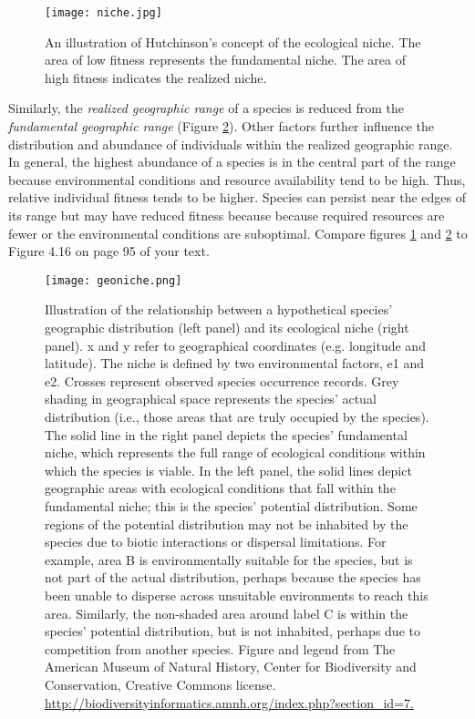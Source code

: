 \documentclass[12pt, oneside]{article}   	%
\begin{document}
\begin{figure}[htb]
	\centering
	\texttt{[image: niche.jpg]}
	\caption{An illustration of Hutchinson's concept of the ecological niche. The area of low fitness represents the fundamental niche. The area of high fitness indicates the realized niche. \label{hutch niche}}
\end{figure}

Similarly, the \emph{realized geographic range} of a species is reduced from the \emph{fundamental geographic range} (Figure \ref{geoniche}). Other factors further influence the distribution and abundance of individuals within the realized geographic range. In general, the highest abundance of a species is in the central part of the range because environmental conditions and resource availability tend to be high. Thus, relative individual fitness tends to be higher.  Species can persist near the edges of its range but may have reduced fitness because because required resources are fewer or the environmental conditions are suboptimal.  Compare figures \ref{hutch niche} and \ref{geoniche} to Figure 4.16 on page 95 of your text.  

\begin{figure}
	\centering
	\texttt{[image: geoniche.png]}
	\caption{Illustration of the relationship between a hypothetical species' geographic distribution (left panel) and its ecological niche (right panel).  x and y refer to geographical coordinates (e.g. longitude and latitude). The niche is defined by two environmental factors, e1 and e2. Crosses represent observed species occurrence records. Grey shading in geographical space represents the species' actual distribution (i.e., those areas that are truly occupied by the species). The solid line in the right panel depicts the species' fundamental niche, which represents the full range of ecological conditions within which the species is viable. In the left panel, the solid lines depict geographic areas with ecological conditions that fall within the fundamental niche; this is the species' potential distribution. Some regions of the potential distribution may not be inhabited by the species due to biotic interactions or dispersal limitations. For example, area B is environmentally suitable for the species, but is not part of the actual distribution, perhaps because the species has been unable to disperse across unsuitable environments to reach this area. Similarly, the non-shaded area around label C is within the species' potential distribution, but is not inhabited, perhaps due to competition from another species. Figure and legend from The American Museum of Natural History, Center for Biodiversity and Conservation, Creative Commons license. \url{http://biodiversityinformatics.amnh.org/index.php?section_id=7.}\label{geoniche}}
\end{figure}
\end{document}
